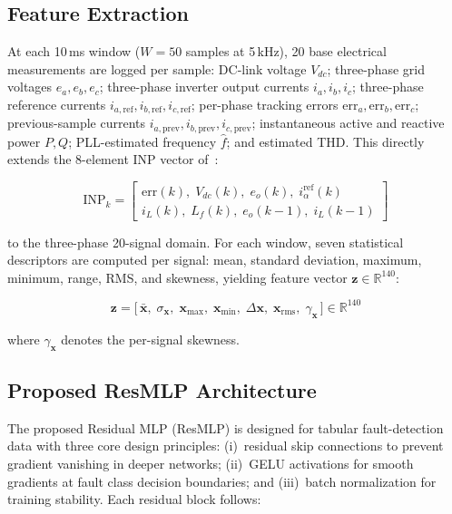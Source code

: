 \documentclass[conference]{IEEEtran}
\begin{document}
\subsection{Feature Extraction}

At each 10\,ms window ($W = 50$ samples at 5\,kHz), 20 base electrical
measurements are logged per sample: DC-link voltage $V_{dc}$; three-phase
grid voltages $e_a, e_b, e_c$; three-phase inverter output currents
$i_a, i_b, i_c$; three-phase reference currents
$i_{a,\mathrm{ref}}, i_{b,\mathrm{ref}}, i_{c,\mathrm{ref}}$; per-phase
tracking errors $\mathrm{err}_a, \mathrm{err}_b, \mathrm{err}_c$;
previous-sample currents $i_{a,\mathrm{prev}}, i_{b,\mathrm{prev}},
i_{c,\mathrm{prev}}$; instantaneous active and reactive power $P, Q$;
PLL-estimated frequency $\hat{f}$; and estimated THD. This directly extends
the 8-element INP vector of~\cite{baker2021}:

\begin{equation}
  \mathrm{INP}_k =
  \begin{bmatrix}
    \mathrm{err}(k),\; V_{dc}(k),\; e_{o}(k),\;
    i_{\alpha}^{\mathrm{ref}}(k) \\[2pt]
    i_{L}(k),\; L_f(k),\; e_{o}(k{-}1),\; i_{L}(k{-}1)
  \end{bmatrix}
  \label{eq:inp_baker}
\end{equation}

\noindent to the three-phase 20-signal domain. For each window, seven
statistical descriptors are computed per signal: mean, standard deviation,
maximum, minimum, range, RMS, and skewness, yielding feature vector
$\mathbf{z} \in \mathbb{R}^{140}$:

\begin{equation}
  \mathbf{z} = \bigl[\,\bar{\mathbf{x}},\;\sigma_{\mathbf{x}},\;
  \mathbf{x}_{\max},\;\mathbf{x}_{\min},\;
  \Delta\mathbf{x},\;\mathbf{x}_{\mathrm{rms}},\;
  \gamma_{\mathbf{x}}\,\bigr] \in \mathbb{R}^{140}
  \label{eq:feature_vec}
\end{equation}

\noindent where $\gamma_{\mathbf{x}}$ denotes the per-signal skewness.

\subsection{Proposed ResMLP Architecture}

The proposed Residual MLP (ResMLP) is designed for tabular fault-detection
data with three core design principles: (i)~residual skip connections to
prevent gradient vanishing in deeper networks; (ii)~GELU activations for
smooth gradients at fault class decision boundaries; and (iii)~batch
normalization for training stability. Each residual block follows:
\end{document}
